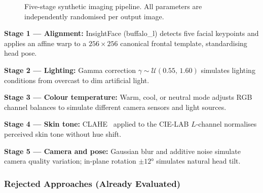 \documentclass[conference]{IEEEtran}
\begin{document}
\begin{figure}[t]
\centering
{}
\caption{Five-stage synthetic imaging pipeline. All parameters are independently randomised per output image.}
\label{fig:pipeline}
\end{figure}

\textbf{Stage 1 — Alignment:} InsightFace (buffalo\_l) detects five facial keypoints and applies an affine warp to a $256\!\times\!256$ canonical frontal template, standardising head pose.

\textbf{Stage 2 — Lighting:} Gamma correction $\gamma\!\sim\!\mathcal{U}(0.55,\,1.60)$ simulates lighting conditions from overcast to dim artificial light.

\textbf{Stage 3 — Colour temperature:} Warm, cool, or neutral mode adjusts RGB channel balances to simulate different camera sensors and light sources.

\textbf{Stage 4 — Skin tone:} CLAHE~\cite{clahe} applied to the CIE-LAB $L$-channel normalises perceived skin tone without hue shift.

\textbf{Stage 5 — Camera and pose:} Gaussian blur and additive noise simulate camera quality variation; in-plane rotation $\pm12°$ simulates natural head tilt.

\subsubsection*{Rejected Approaches (Already Evaluated)}
\end{document}
